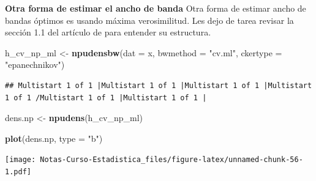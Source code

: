 \documentclass[
  12pt,
]{book}
\newenvironment{Shaded}{\begin{snugshade}}{\end{snugshade}}
\newcommand{\DataTypeTok}[1]{\textcolor[rgb]{0.13,0.29,0.53}{#1}}
\newcommand{\DecValTok}[1]{\textcolor[rgb]{0.00,0.00,0.81}{#1}}
\newcommand{\KeywordTok}[1]{\textcolor[rgb]{0.13,0.29,0.53}{\textbf{#1}}}
\newcommand{\NormalTok}[1]{#1}
\newcommand{\OperatorTok}[1]{\textcolor[rgb]{0.81,0.36,0.00}{\textbf{#1}}}
\newcommand{\StringTok}[1]{\textcolor[rgb]{0.31,0.60,0.02}{#1}}
\theoremstyle{definition}
\theoremstyle{definition}
\theoremstyle{definition}
\theoremstyle{remark}
\begin{document}
\textbf{Otra forma de estimar el ancho de banda} Otra forma de estimar ancho de bandas óptimos es usando máxima verosimilitud. Les dejo de tarea revisar la sección 1.1 del artículo de \autocite{Hall1987} para entender su estructura.

\begin{Shaded}
\begin{Highlighting}[]
\NormalTok{h_cv_np_ml <-}\StringTok{ }\KeywordTok{npudensbw}\NormalTok{(}\DataTypeTok{dat =}\NormalTok{ x, }\DataTypeTok{bwmethod =} \StringTok{"cv.ml"}\NormalTok{, }
    \DataTypeTok{ckertype =} \StringTok{"epanechnikov"}\NormalTok{)}
\end{Highlighting}
\end{Shaded}

\begin{verbatim}
## Multistart 1 of 1 |Multistart 1 of 1 |Multistart 1 of 1 |Multistart 1 of 1 /Multistart 1 of 1 |Multistart 1 of 1 |                   
\end{verbatim}

\begin{Shaded}
\begin{Highlighting}[]
\NormalTok{dens.np <-}\StringTok{ }\KeywordTok{npudens}\NormalTok{(h_cv_np_ml)}

\KeywordTok{plot}\NormalTok{(dens.np, }\DataTypeTok{type =} \StringTok{"b"}\NormalTok{)}
\end{Highlighting}
\end{Shaded}

\texttt{[image: Notas-Curso-Estadistica\_files/figure-latex/unnamed-chunk-56-1.pdf]}

\begin{Shaded}
\end{Shaded}
\end{document}

